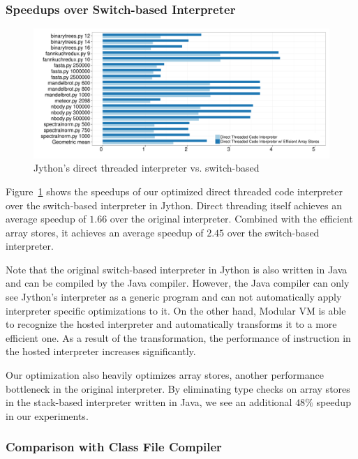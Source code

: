 \subsubsection{Speedups over Switch-based Interpreter}

\begin{figure}
\centering
\includegraphics[scale=.42]{figures/ch2-benchmark-jython-direct-threading-rawinterpreter.pdf}
\caption{Jython's direct threaded interpreter vs. switch-based}
\label{fig:benchmark-jython-direct-threading-rawinterpreter}
\end{figure}

Figure~\ref{fig:benchmark-jython-direct-threading-rawinterpreter} shows the speedups of our optimized direct threaded code interpreter over the switch-based interpreter in Jython.
Direct threading itself achieves an average speedup of $1.66$ over the original interpreter.
Combined with the efficient array stores, it achieves an average speedup of $2.45$ over the switch-based interpreter.

Note that the original switch-based interpreter in Jython is also written in Java and can be compiled by the Java compiler.
However, the Java compiler can only see Jython's interpreter as a generic program and can not automatically apply interpreter specific optimizations to it.
On the other hand, Modular VM is able to recognize the hosted interpreter and automatically transforms it to a more efficient one.
As a result of the transformation, the performance of instruction in the hosted interpreter increases significantly.

Our optimization also heavily optimizes array stores, another performance bottleneck in the original interpreter.
By eliminating type checks on array stores in the stack-based interpreter written in Java, we see an additional $48\%$ speedup in our experiments.

\subsubsection{Comparison with Class File Compiler}

